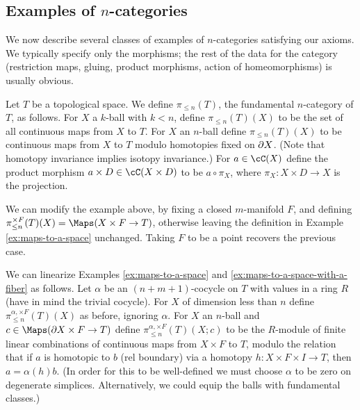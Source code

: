 \subsection{Examples of \texorpdfstring{$n$}{n}-categories}
\label{ss:ncat-examples}


We now describe several classes of examples of $n$-categories satisfying our axioms.
We typically specify only the morphisms; the rest of the data for the category
(restriction maps, gluing, product morphisms, action of homeomorphisms) is usually obvious.

\begin{example}
\rm
\label{ex:maps-to-a-space}%
Let $T$ be a topological space.
We define $\pi_{\leq n}(T)$, the fundamental $n$-category of $T$, as follows.
For $X$ a $k$-ball with $k < n$, define $\pi_{\leq n}(T)(X)$ to be the set of 
all continuous maps from $X$ to $T$.
For $X$ an $n$-ball define $\pi_{\leq n}(T)(X)$ to be continuous maps from $X$ to $T$ modulo
homotopies fixed on $\partial X$.
(Note that homotopy invariance implies isotopy invariance.)
For $a\in \cC(X)$ define the product morphism $a\times D \in \cC(X\times D)$ to
be $a\circ\pi_X$, where $\pi_X : X\times D \to X$ is the projection.
\end{example}


\begin{example} \label{ex:maps-with-fiber}
\rm
\label{ex:maps-to-a-space-with-a-fiber}%
We can modify the example above, by fixing a
closed $m$-manifold $F$, and defining $\pi^{\times F}_{\leq n}(T)(X) = \Maps(X \times F \to T)$, 
otherwise leaving the definition in Example \ref{ex:maps-to-a-space} unchanged.
Taking $F$ to be a point recovers the previous case.
\end{example}

\begin{example}
\rm
\label{ex:linearized-maps-to-a-space}%
We can linearize Examples \ref{ex:maps-to-a-space} and \ref{ex:maps-to-a-space-with-a-fiber} as follows.
Let $\alpha$ be an $(n{+}m{+}1)$-cocycle on $T$ with values in a ring $R$
(have in mind the trivial cocycle).
For $X$ of dimension less than $n$ define $\pi^{\alpha, \times F}_{\leq n}(T)(X)$ as before, ignoring $\alpha$.
For $X$ an $n$-ball and $c\in \Maps(\bdy X \times F \to T)$ define $\pi^{\alpha, \times F}_{\leq n}(T)(X; c)$ to be
the $R$-module of finite linear combinations of continuous maps from $X\times F$ to $T$,
modulo the relation that if $a$ is homotopic to $b$ (rel boundary) via a homotopy
$h: X\times F\times I \to T$, then $a = \alpha(h)b$.
(In order for this to be well-defined we must choose $\alpha$ to be zero on degenerate simplices.
Alternatively, we could equip the balls with fundamental classes.)
\end{example}

